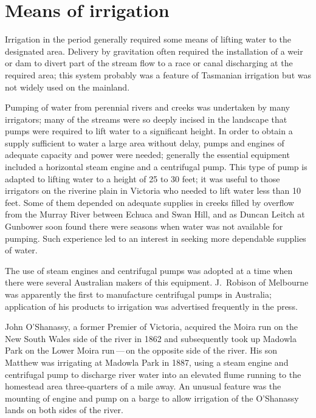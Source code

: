 \section*{Means of irrigation}

Irrigation in the period generally required some means of lifting
water to the designated area.  Delivery by gravitation often required
the installation of a weir or
dam to divert part of the stream flow to a race
or canal discharging at the required area;
this system probably was a feature of Tasmanian irrigation but was not
widely used on the mainland.

Pumping of water from perennial rivers and creeks was undertaken by
many irrigators; many of the streams were so deeply incised in the
landscape that pumps were required to lift water to a significant
height.  In order to obtain a supply sufficient to water a large area
without delay, pumps and engines of adequate capacity and power were
needed; generally the essential equipment included a horizontal steam
engine and a centrifugal pump. %
 This type of pump is adapted to
lifting water to a height of 25 to 30 feet; it was useful to those
irrigators on the riverine plain in Victoria who needed to lift water
less than 10 feet.  Some of them depended on adequate supplies in
creeks filled by overflow from the Murray River 
between Echuca  and Swan Hill,  and as Duncan Leitch   at Gunbower soon found
there were seasons when water was not available for pumping.  Such
experience led to an interest in seeking more dependable supplies of
water.

The use of steam engines and centrifugal pumps was adopted at a time
when there were several Australian makers of this equipment.
J.~Robison  of Melbourne was apparently the first
to manufacture centrifugal %
pumps in Australia; application of his
products to irrigation was advertised frequently in the
press.

John O'Shanassy,  a former Premier of Victoria,
acquired the Moira  run on the New South Wales
side of the river in 1862 and subsequently took up Madowla Park
  on the Lower Moira run\,---\,on the
opposite si\-de of the river.  His son Matthew 
was irrigating at Madowla Park in 1887, using a steam engine and
centrifugal pump  to
discharge river water into an elevated flume running to the homestead
area three-quarters of a mile away. An unusual feature was the
mounting of engine and pump on a barge to allow irrigation of the
O'Shanassy lands on both sides of the river.

